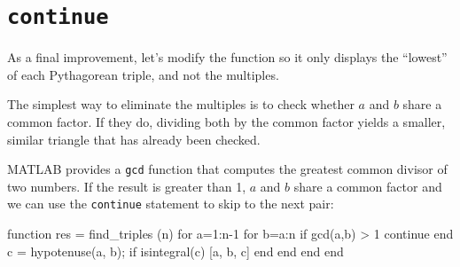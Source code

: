 \documentclass[
]{book}
\numberwithin{Answer}{chapter}
\numberwithin{Exercise}{chapter}
\begin{document}
%
%
%
%
%
%
%
%
%


\section{{\tt continue}}


As a final improvement, let's modify the function so it only
displays the ``lowest'' of each Pythagorean triple, and not the
multiples.

The simplest way to eliminate the multiples is to check whether
$a$ and $b$ share a common factor.  If they do, dividing both
by the common factor yields a smaller, similar triangle that has
already been checked.


MATLAB provides a {\tt gcd} function that computes the greatest common
divisor of two numbers.  If the result is greater than 1,
$a$ and $b$ share a common factor and we can use the {\tt continue}
statement to skip to the next pair:

\begin{code}
function res = find_triples (n)
    for a=1:n-1
        for b=a:n
            if gcd(a,b) > 1
                continue
            end
            c = hypotenuse(a, b);
            if isintegral(c)
                [a, b, c]
            end
        end
    end
end
\end{code}
\end{document}
